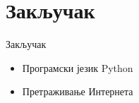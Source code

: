 \documentclass[11pt, serbianc, english]{beamer}
\begin{document}
\section{Закључак}
\begin{frame}{Закључак}
    \begin{itemize}
            \item Програмски језик Python
            \pause
            \item Претраживање Интернета
    \end{itemize}
\end{frame}
\end{document}
